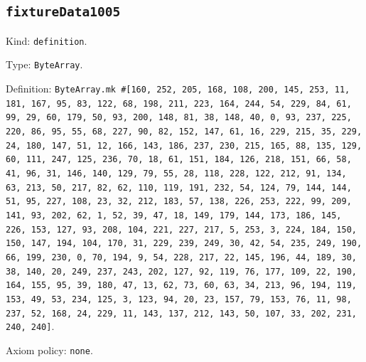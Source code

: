 \documentclass[11pt]{article}
\begin{document}
\subsection*{\texttt{fixtureData1005}}
\noindent Kind: \texttt{definition}.\par
\noindent Type: \texttt{ByteArray}.\par
\noindent Definition: \texttt{ByteArray.mk \#[160, 252, 205, 168, 108, 200, 145, 253, 11, 181, 167, 95, 83, 122, 68, 198, 211, 223, 164, 244, 54, 229, 84, 61, 99, 29, 60, 179, 50, 93, 200, 148, 81, 38, 148, 40, 0, 93, 237, 225, 220, 86, 95, 55, 68, 227, 90, 82, 152, 147, 61, 16, 229, 215, 35, 229, 24, 180, 147, 51, 12, 166, 143, 186, 237, 230, 215, 165, 88, 135, 129, 60, 111, 247, 125, 236, 70, 18, 61, 151, 184, 126, 218, 151, 66, 58, 41, 96, 31, 146, 140, 129, 79, 55, 28, 118, 228, 122, 212, 91, 134, 63, 213, 50, 217, 82, 62, 110, 119, 191, 232, 54, 124, 79, 144, 144, 51, 95, 227, 108, 23, 32, 212, 183, 57, 138, 226, 253, 222, 99, 209, 141, 93, 202, 62, 1, 52, 39, 47, 18, 149, 179, 144, 173, 186, 145, 226, 153, 127, 93, 208, 104, 221, 227, 217, 5, 253, 3, 224, 184, 150, 150, 147, 194, 104, 170, 31, 229, 239, 249, 30, 42, 54, 235, 249, 190, 66, 199, 230, 0, 70, 194, 9, 54, 228, 217, 22, 145, 196, 44, 189, 30, 38, 140, 20, 249, 237, 243, 202, 127, 92, 119, 76, 177, 109, 22, 190, 164, 155, 95, 39, 180, 47, 13, 62, 73, 60, 63, 34, 213, 96, 194, 119, 153, 49, 53, 234, 125, 3, 123, 94, 20, 23, 157, 79, 153, 76, 11, 98, 237, 52, 168, 24, 229, 11, 143, 137, 212, 143, 50, 107, 33, 202, 231, 240, 240]}.\par
\noindent Axiom policy: \texttt{none}.\par
\end{document}
